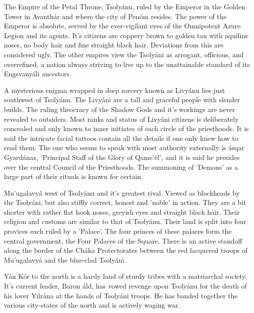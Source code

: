 The Empire of the Petal Throne, Tsolyánu, ruled by the Emperor in the Golden Tower in Avanthár and where the city of Penóm resides. The power of the Emperor is absolute, served by the ever-vigilant eyes of the Omnipotent Azure Legion and its agents. It's citizens are coppery brown to golden tan with aquiline noses, no body hair and fine straight black hair. Deviations from this are considered ugly. The other empires view the Tsolyáni as arrogant, officious, and overrefined, a nation always striving to live up to the unattainable standard of its Engsvanyáli ancestors.

A mysterious enigma wrapped in deep sorcery known as Livyánu lies just southwest of Tsolyánu. The Livyáni are a tall and graceful people with slender builds. The ruling theocracy of the Shadow Gods and it's workings are never revealed to outsiders. Most ranks and status of Livyáni citizens is deliberately concealed and only known to inner initiates of each circle of the priesthoods. It is said the intricate facial tattoos contain all the details if one only knew how to read them. The one who seems to speak with most authority externally is ásqar Gyardánaz, ‘Principal Staff of the Glory of Qame’él’, and it is said he presides over the central Council of the Priesthoods. The summoning of 'Demons' as a large part of their rituals is known for certain.

Mu’ugalavyá west of Tsolyánu and it's greatest rival. Viewed as blockheads by the Tsolyáni, but also stiffly correct, honest and 'noble' in action. They are a bit shorter with rather flat hook noses, greyish eyes and straight black hair. Their religion and customs are similar to that of Tsolyánu. Their land is split into four provices each ruled by a 'Palace'. The four princes of these palaces form the central government, the Four Palaces of the Square. There is an active standoff along the border of the Cháka Protectorates between the red lacquered troops of Mu’ugalavyá and the blue-clad Tsolyáni.

Yán Kór to the north is a hardy land of sturdy tribes with a matriarchal society. It's current leader, Baron áld, has vowed revenge upon Tsolyánu for the death of his lover Yilrána at the hands of Tsolyáni troops. He has banded together the various city-states of the north and is actively waging war. 

